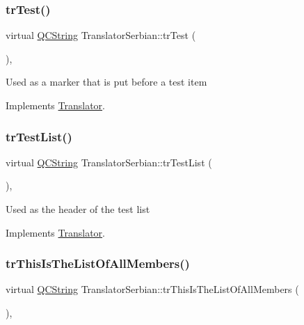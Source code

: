 \subsubsection{\texorpdfstring{trTest()}{trTest()}}
{\footnotesize\ttfamily virtual \mbox{\hyperlink{class_q_c_string}{Q\+C\+String}} Translator\+Serbian\+::tr\+Test (\begin{DoxyParamCaption}{ }\end{DoxyParamCaption})\hspace{0.3cm}{\ttfamily [inline]}, {\ttfamily [virtual]}}

Used as a marker that is put before a test item 

Implements \mbox{\hyperlink{class_translator}{Translator}}.

\mbox{\label{class_translator_serbian_ae7f57dbee5863863fd635dfad556215f}} 
\subsubsection{\texorpdfstring{trTestList()}{trTestList()}}
{\footnotesize\ttfamily virtual \mbox{\hyperlink{class_q_c_string}{Q\+C\+String}} Translator\+Serbian\+::tr\+Test\+List (\begin{DoxyParamCaption}{ }\end{DoxyParamCaption})\hspace{0.3cm}{\ttfamily [inline]}, {\ttfamily [virtual]}}

Used as the header of the test list 

Implements \mbox{\hyperlink{class_translator}{Translator}}.

\mbox{\label{class_translator_serbian_a79615d96c5e07780c1221a9a50c4826a}} 
\subsubsection{\texorpdfstring{trThisIsTheListOfAllMembers()}{trThisIsTheListOfAllMembers()}}
{\footnotesize\ttfamily virtual \mbox{\hyperlink{class_q_c_string}{Q\+C\+String}} Translator\+Serbian\+::tr\+This\+Is\+The\+List\+Of\+All\+Members (\begin{DoxyParamCaption}{ }\end{DoxyParamCaption})\hspace{0.3cm}{\ttfamily [inline]}, {\ttfamily [virtual]}}


